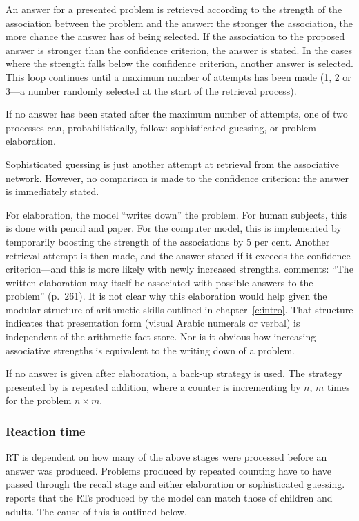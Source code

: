 An answer for a presented problem is retrieved according to the strength
of the association between the problem and the answer: the stronger the
association, the more chance the answer has
of being selected. If the association to the proposed answer is stronger
than the confidence criterion, the answer is stated.  In the cases where
the strength falls below the confidence criterion, another answer is
selected. This loop continues until a maximum number of attempts has been
made (1, 2 or 3---a number randomly selected at the start of the retrieval
process).

If no answer has been stated after the maximum number of attempts, one of
two processes can, probabilistically, follow: sophisticated guessing, or
problem elaboration.

Sophisticated guessing is just another attempt at retrieval from the
associative network.  However, no comparison is made to the
confidence criterion: the answer is immediately stated.

For elaboration, the model ``writes down'' the problem. For
human subjects,
this is done with pencil and paper.  For the computer model, this is
implemented by temporarily boosting the strength of the associations by 5
per cent.  Another retrieval attempt is then made, and the answer stated if
it exceeds the confidence criterion---and this is more likely with newly
increased strengths.  comments: ``The written elaboration
may itself be associated with possible answers to the problem'' (p.~261).
It is not clear why this elaboration would help given the
modular structure of arithmetic skills outlined in chapter~\ref{c:intro}.
That structure indicates that presentation form (visual Arabic numerals
or verbal) is
independent of the arithmetic fact store.  Nor is it obvious how increasing
associative strengths is equivalent to the writing down of a problem.

If no answer is given after elaboration, a back-up strategy is used. The
strategy presented by \citeauthor{siegmult} is repeated addition, where a
counter is incrementing by $n$, $m$ times for the problem $n\times m$.

\subsubsection{Reaction time}

RT is dependent on how many of the above stages were processed before an
answer was produced.  Problems produced by repeated counting have to have
passed through the recall stage and either elaboration or sophisticated
guessing.   reports that the RTs produced by the
model can match those of children and adults.  The cause of this is
outlined below.

